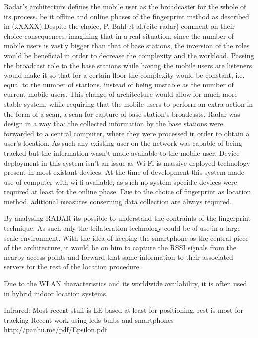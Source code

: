	Radar's architecture defines the mobile user as the broadcaster for the whole of its process, be it offline and online phases of the fingerprint method as described in (xXXXX).Despite the choice, P. Bahl et al,(cite radar) comment on their choice consequences, imagining that in a real situation, since the number of mobile users is vastly bigger than that of base stations, the inversion of the roles would be beneficial in order to decrease the complexity and the workload. Passing the broadcast role to the base stations while having the mobile users are listeners would make it so that for a certain floor the complexity would be constant, i.e. equal to the number of stations, instead of being unstable as the number of current mobile users. This change of architecture would allow for much more stable system, while requiring that the mobile users to perform an extra action in the form of a scan, a scan for capture of base station's broadcasts. Radar was design in a way that the collected information by the base stations were forwarded to a central computer, where they were processed in order to obtain a user's location. As such any existing user on the network was capable of being tracked but the information wasn't made available to the mobile user. Device deployment in this system isn't an issue as Wi-Fi is massive deployed technology present in most existant devices. At the time of development this system made use of computer with wi-fi available, as such no system specidic devices were required at least for the online phase. Due to the choice of fingerprint as location method, aditional measures conserning data collection are always required.

	By analysing RADAR its possible to understand the contraints of the fingerprint technique. As such only the trilateration technology could be of use in a large scale environment. With the idea of keeping the smartphone as the central piece of the  architecture, it would be on him to capture the \ac{RSSI} signals from the nearby access points and forward that same information to their associated servers for the rest of the location procedure.


	Due to the WLAN characteristics and its worldwide availability, it is often used in hybrid indoor location systems. 



Infrared: 
	Most recent stuff is LE based at least for positioning, rest is most for tracking
	Recent work using leds bulbs and smartphones
	http://panhu.me/pdf/Epsilon.pdf

